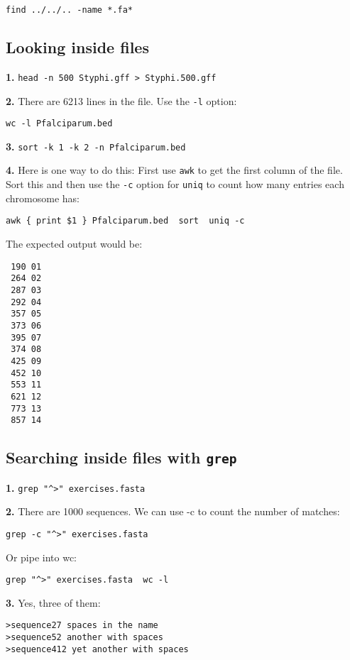 \documentclass[11pt]{article}
\begin{document}
\texttt{find\ ../../..\ -name\ *.fa*}

    \hypertarget{looking-inside-files}{%
\subsection{Looking inside files}\label{looking-inside-files}}

\textbf{1.}
\texttt{head\ -n\ 500\ Styphi.gff\ \textgreater{}\ Styphi.500.gff}

\textbf{2.} There are 6213 lines in the file. Use the \texttt{-l}
option:

\texttt{wc\ -l\ Pfalciparum.bed}

\textbf{3.} \texttt{sort\ -k\ 1\ -k\ 2\ -n\ Pfalciparum.bed}

\textbf{4.} Here is one way to do this: First use \texttt{awk} to get
the first column of the file. Sort this and then use the \texttt{-c}
option for \texttt{uniq} to count how many entries each chromosome has:

\texttt{awk\ \textquotesingle{}\{\ print\ \$1\ \}\textquotesingle{}\ Pfalciparum.bed\ \textbar{}\ sort\ \textbar{}\ uniq\ -c}

The expected output would be:

\begin{verbatim}
 190 01
 264 02
 287 03
 292 04
 357 05
 373 06
 395 07
 374 08
 425 09
 452 10
 553 11
 621 12
 773 13
 857 14
\end{verbatim}

    \hypertarget{searching-inside-files-with-grep}{%
\subsection{\texorpdfstring{Searching inside files with
\texttt{grep}}{Searching inside files with grep}}\label{searching-inside-files-with-grep}}

\textbf{1.} \texttt{grep\ "\^{}\textgreater{}"\ exercises.fasta}

\textbf{2.} There are 1000 sequences. We can use -c to count the number
of matches:

\texttt{grep\ -c\ "\^{}\textgreater{}"\ exercises.fasta}

Or pipe into wc:

\texttt{grep\ "\^{}\textgreater{}"\ exercises.fasta\ \textbar{}\ wc\ -l}

\textbf{3.} Yes, three of them:

\begin{verbatim}
>sequence27 spaces in the name
>sequence52 another with spaces
>sequence412 yet another with spaces
\end{verbatim}
\end{document}
